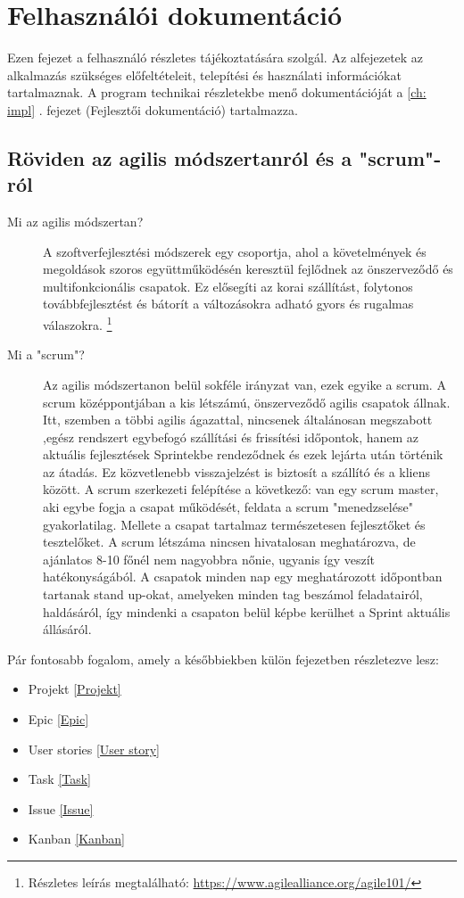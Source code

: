 \chapter{Felhasználói dokumentáció} %
\label{ch:user}

Ezen fejezet a felhasználó részletes tájékoztatására szolgál. Az alfejezetek az alkalmazás szükséges előfeltételeit, telepítési és használati információkat tartalmaznak. A program technikai részletekbe menő dokumentációját a \ref{ch: impl} . fejezet (Fejlesztői dokumentáció) tartalmazza.


\section{Röviden az agilis módszertanról és a  "scrum"-ról} %

\begin{description}
	\item[Mi az agilis módszertan?] A szoftverfejlesztési módszerek egy csoportja, ahol a követelmények és megoldások szoros együttműködésén keresztül fejlődnek az önszerveződő  és 		     	multifonkcionális csapatok. Ez elősegíti az korai szállítást, folytonos továbbfejlesztést és bátorít a változásokra adható gyors és rugalmas válaszokra. \footnote{Részletes leírás 		 	   	megtalálható: \url{https://www.agilealliance.org/agile101/}}
	\item[Mi a "scrum"?] Az agilis módszertanon belül sokféle irányzat van, ezek egyike a scrum. A scrum középpontjában a kis létszámú, önszerveződő agilis csapatok állnak. Itt,
 szemben a többi agilis ágazattal, nincsenek általánosan megszabott ,egész rendszert egybefogó szállítási és frissítési időpontok, hanem az aktuális fejlesztések Sprintekbe rendeződnek és ezek lejárta után történik az átadás. Ez közvetlenebb visszajelzést is biztosít a szállító és a kliens között. A scrum szerkezeti felépítése a következő: van egy scrum master, aki egybe fogja a csapat működését, feldata a scrum "menedzselése" gyakorlatilag. Mellete a csapat tartalmaz természetesen fejlesztőket és tesztelőket. A scrum létszáma nincsen hivatalosan meghatározva, de ajánlatos 8-10 főnél nem nagyobbra nőnie, ugyanis így veszít hatékonyságából. A csapatok minden nap egy meghatározott időpontban tartanak stand up-okat, amelyeken minden tag beszámol feladatairól, haldásáról, így mindenki a csapaton belül képbe kerülhet a Sprint aktuális állásáról.
\end{description}

Pár fontosabb fogalom, amely a későbbiekben külön fejezetben részletezve lesz:
\begin{itemize}
	\item Projekt \ref{Projekt}
	\item Epic \ref{Epic}
	\item User stories \ref{User story}
	\item Task \ref{Task}
	\item Issue \ref{Issue}
	\item Kanban \ref{Kanban}
\end{itemize}

